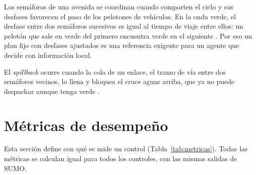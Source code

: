Los semáforos de una avenida se coordinan cuando comparten el ciclo y sus desfases favorecen el
paso de los pelotones de vehículos. En la onda verde, el desfase entre dos semáforos sucesivos es
igual al tiempo de viaje entre ellos: un pelotón que sale en verde del primero encuentra verde en
el siguiente \citep{HCM2000_or_2010}. Por eso un plan fijo con desfases ajustados es una
referencia exigente para un agente que decide con información local.

El \textit{spillback} ocurre cuando la cola de un enlace, el tramo de vía entre dos semáforos
vecinos, lo llena y bloquea el cruce aguas arriba, que ya no puede despachar aunque tenga verde
\citep{Koonce2008_TSTM,HCM2000_or_2010}.

\section{Métricas de desempeño}
\label{sec:teoria-metricas}

Esta sección define con qué se mide un control (Tabla~\ref{tab:metricas}). Todas las métricas se
calculan igual para todos los controles, con las mismas salidas de SUMO.

